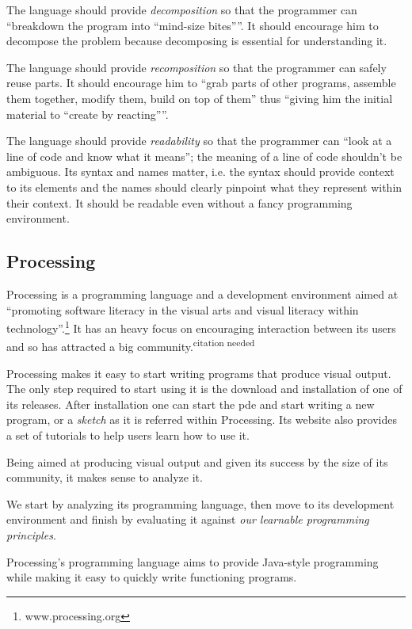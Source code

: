 \documentclass{./llncs2e/llncs}
\begin{document}
	The language should provide \emph{decomposition} so that the programmer can ``breakdown the program into ``mind-size bites''''. It should encourage him to decompose the problem because decomposing is essential for understanding it.

	The language should provide \emph{recomposition} so that the programmer can safely reuse parts. It should encourage him to ``grab parts of other programs, assemble them together, modify them, build on top of them'' thus ``giving him the initial material to ``create by reacting''''.

	The language should provide \emph{readability} so that the programmer can ``look at a line of code and know what it means''; the meaning of a line of code shouldn't be ambiguous. Its syntax and names matter, i.e. the syntax should provide context to its elements and the names should clearly pinpoint what they represent within their context. It should be readable even without a fancy programming environment.

\subsection{Processing\cite{reas2007processing}}
	Processing is a programming language and a development environment aimed at ``promoting software literacy in the visual arts and visual literacy within technology''.\footnote{www.processing.org} It has an heavy focus on encouraging interaction between its users and so has attracted a big community.\textsuperscript{citation needed}

	Processing makes it easy to start writing programs that produce visual output. The only step required to start using it is the download and installation of one of its releases. After installation one can start the \ac{pde} and start writing a new program, or a \emph{sketch} as it is referred within Processing. Its website also provides a set of tutorials to help users learn how to use it.

	Being aimed at producing visual output and given its success by the size of its community, it makes sense to analyze it.

	We start by analyzing its programming language, then move to its development environment and finish by evaluating it against \emph{our learnable programming principles}.

	Processing's programming language aims to provide Java-style programming while making it easy to quickly write functioning programs. 
\end{document}
